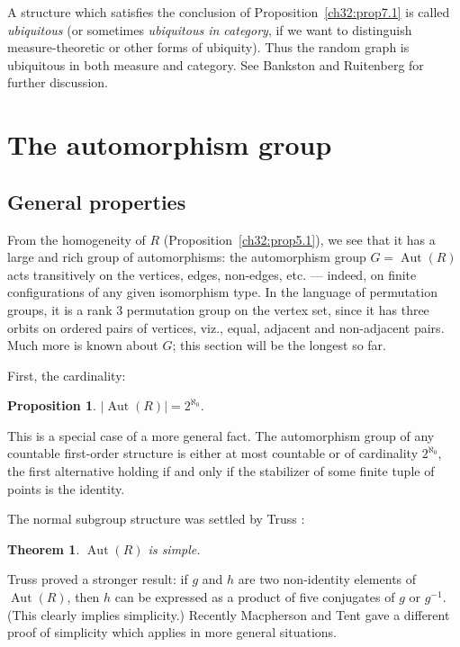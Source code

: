 \documentclass[12pt]{article}
\newtheorem{theorem}{Theorem}
\newtheorem{proposition}{Proposition}
\DeclareMathOperator{\Aut}{Aut}
\begin{document}
A structure which satisfies the conclusion of
Proposition~\ref{ch32:prop7.1} is called \emph{ubiquitous} (or
sometimes \emph{ubiquitous in category}, if we want to distinguish
measure-theoretic or other forms of ubiquity). Thus the random graph
is ubiquitous in both measure and category. See Bankston and
Ruitenberg \cite{ch32:bib1} for further discussion.

\section{The automorphism group}%
\label{ch32:sec2.8}

\subsection{General properties}

From the homogeneity of $R$ (Proposition~\ref{ch32:prop5.1}), we
see that it has a large and rich group of automorphisms: the
automorphism group $G = \Aut(R)$ acts transitively on the
vertices, edges, non-edges, etc. --- indeed, on finite
configurations of any given isomorphism type. In the language of
permutation groups, it is a rank $3$ permutation group on the vertex
set, since it has three orbits on ordered pairs of vertices, viz.,
equal, adjacent and non-adjacent pairs. Much more is known about
$G$; this section will be the longest so far.

First, the cardinality: 

\begin{proposition}\label{ch32:prop8.1} 
$|\Aut(R)| = 2^{\aleph_0}$.
\end{proposition}

This is a special case of a more general fact. The automorphism
group of any countable first-order structure is either at most
countable or of cardinality $2^{\aleph_0}$, the first alternative
holding if and only if the stabilizer of some finite tuple of points
is the identity.

The normal subgroup structure was settled by Truss \cite{ch32:bib51}:

\begin{theorem}\label{ch32:them8.1} 
$\Aut(R)$ is simple.
\end{theorem}

Truss proved a stronger result: if $g$ and $h$ are two non-identity
elements of $\Aut(R)$, then $h$ can be expressed as a
product of five conjugates of $g$ or $g^{-1}$. (This clearly implies
simplicity.) Recently Macpherson and Tent \cite{ch32:new11} gave a
different proof of simplicity which applies in more general situations. 
\end{document}
